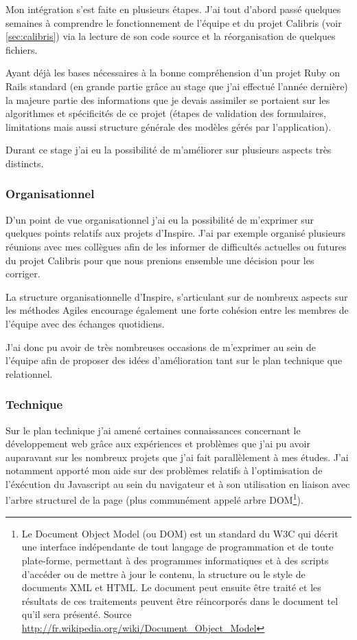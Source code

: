 \documentclass[12pt,a4paper]{book}
\begin{document}
Mon intégration s'est faite en plusieurs étapes. J'ai tout d'abord passé quelques semaines à comprendre le fonctionnement de l'équipe et du projet Calibris (voir \cref{sec:calibris}) via la lecture de son code source et la réorganisation de quelques fichiers.

Ayant déjà les bases nécessaires à la bonne compréhension d'un projet Ruby on Rails standard (en grande partie grâce au stage que j'ai effectué l'année dernière) la majeure partie des informations que je devais assimiler se portaient sur les algorithmes et spécificités de ce projet (étapes de validation des formulaires, limitations mais aussi structure générale des modèles gérés par l'application).

Durant ce stage j'ai eu la possibilité de m'améliorer sur plusieurs aspects très distincts.

\subsubsection{Organisationnel}

D'un point de vue organisationnel j'ai eu la possibilité de m'exprimer sur quelques points relatifs aux projets d'Inspire. J'ai par exemple organisé plusieurs réunions avec mes collègues afin de les informer de difficultés actuelles ou futures du projet Calibris pour que nous prenions ensemble une décision pour les corriger.

La structure organisationnelle d'Inspire, s'articulant sur de nombreux aspects sur les méthodes Agiles encourage également une forte cohésion entre les membres de l'équipe avec des échanges quotidiens.

J'ai donc pu avoir de très nombreuses occasions de m'exprimer au sein de l'équipe afin de proposer des idées d'amélioration tant sur le plan technique que relationnel.

\subsubsection{Technique}

Sur le plan technique j'ai amené certaines connaissances concernant le développement web grâce aux expériences et problèmes que j'ai pu avoir auparavant sur les nombreux projets que j'ai fait parallèlement à mes études. J'ai notamment apporté mon aide sur des problèmes relatifs à l'optimisation de l'éxécution du Javascript au sein du navigateur et à son utilisation en liaison avec l'arbre structurel de la page (plus communément appelé arbre DOM\footnote{Le Document Object Model (ou DOM) est un standard du W3C qui décrit une interface indépendante de tout langage de programmation et de toute plate-forme, permettant à des programmes informatiques et à des scripts d'accéder ou de mettre à jour le contenu, la structure ou le style de documents XML et HTML. Le document peut ensuite être traité et les résultats de ces traitements peuvent être réincorporés dans le document tel qu'il sera présenté. Source \url{http://fr.wikipedia.org/wiki/Document_Object_Model}}).
\end{document}

